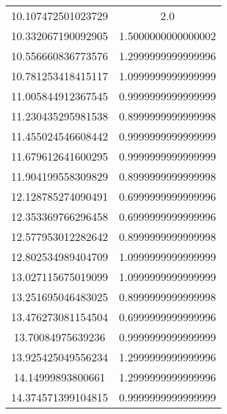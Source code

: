 \begin{table}
\begin{tabular}{S[]S[]}
10.107472501023729 & 2.0\\
10.332067190092905 & 1.5000000000000002\\
10.556660836773576 & 1.2999999999999996\\
10.781253418415117 & 1.0999999999999999\\
11.005844912367545 & 0.9999999999999999\\
11.230435295981538 & 0.8999999999999998\\
11.455024546608442 & 0.9999999999999999\\
11.679612641600295 & 0.9999999999999999\\
11.904199558309829 & 0.8999999999999998\\
12.128785274090491 & 0.6999999999999996\\
12.353369766296458 & 0.6999999999999996\\
12.577953012282642 & 0.8999999999999998\\
12.802534989404709 & 1.0999999999999999\\
13.027115675019099 & 1.0999999999999999\\
13.251695046483025 & 0.8999999999999998\\
13.476273081154504 & 0.6999999999999996\\
13.70084975639236 & 0.9999999999999999\\
13.925425049556234 & 1.2999999999999996\\
14.14999893800661 & 1.2999999999999996\\
14.374571399104815 & 0.9999999999999999\\
\bottomrule
\end{tabular}\end{table}